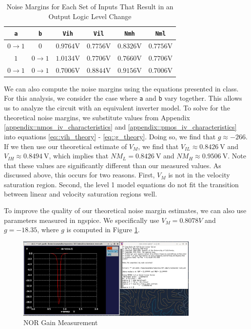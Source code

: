 \documentclass{article}
\begin{document}
	\begin{table}[H]
	\begin{center}
	\caption{Noise Margins for Each Set of Inputs That Result in an Output Logic Level Change}
	\label{table::nor_gate_noise_analysis}
	\begin{tabular}{| c | c | c | c | c | c |}
		\hline
		\texttt{a} & \texttt{b} & \texttt{Vih} & \texttt{Vil} & \texttt{Nmh} & \texttt{Nml} \\
		\hline	
		$0 \rightarrow 1$ & $0$ & $0.9764 \text{V}$ & $0.7756 \text{V}$ & $0.8326 \text{V}$ & $0.7756 \text{V}$\\
		\hline	
		$1$ & $0 \rightarrow 1$ & $1.0134 \text{V}$ & $0.7706 \text{V}$ & $0.7660 \text{V}$ & $0.7706 \text{V}$\\
		\hline	
		$0 \rightarrow 1$ & $0 \rightarrow 1$ & $0.7006 \text{V}$ & $0.8844 \text{V}$ & $0.9156 \text{V}$ & $0.7006 \text{V}$\\
		\hline
	\end{tabular}
	\end{center}
	\end{table}
	
	We can also compute the noise margins using the equations presented in class. For this analysis, we consider the case where \texttt{a} and \texttt{b} vary together. This allows us to analyze the circuit with an equivalent inverter model. To solve for the theoretical noise margins, we substitute values from Appendix \ref{appendix::nmos_iv_characteristics} and \ref{appendix::pmos_iv_characteristics} into equations \ref{eq::vih_theory} - \ref{eq::g_theory}. Doing so, we find that $g \approx -266$. If we then use our theoretical estimate of $V_{M}$, we find that $V_{IL} \approx 0.8426\ \text{V}$ and $V_{IH} \approx 0.8494\ \text{V}$, which implies that $NM_L = 0.8426\ \text{V}$ and $NM_H \approx 0.9506\ \text{V}$. Note that these values are significantly different than our measured values. As discussed above, this occurs for two reasons. First, $V_M$ is not in the velocity saturation region. Second, the level 1 model equations do not fit the transition between linear and velocity saturation regions well.
	
	To improve the quality of our theoretical noise margin estimates, we can also use parameters measured in ngspice. We specifically use $V_M = 0.8078 V$ and $g = -18.35$, where $g$ is computed in Figure \ref{fig::nor_noise_analysis_g_sweep_va_vb}.
	
	\begin{figure}[H]
		\centerline{\includegraphics[width=0.8\textwidth]{nor_noise_analysis_g_sweep_va_vb.png}}
		\caption{NOR Gain Measurement}
		\label{fig::nor_noise_analysis_g_sweep_va_vb}
	\end{figure}
	
\end{document}
